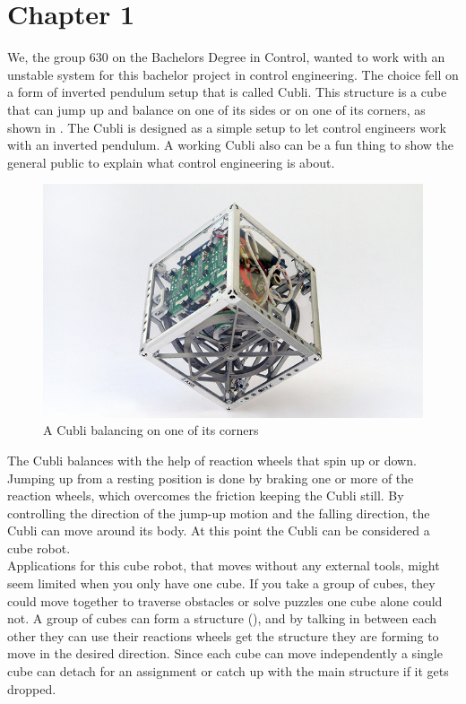 \chapter{Chapter 1}
We, the group 630 on the Bachelors Degree in Control, wanted to work with an unstable system for this bachelor project in control engineering. The choice fell on a form of inverted pendulum setup that is called Cubli. This structure is a cube that can jump up and balance on one of its sides or on one of its corners, as shown in .
The Cubli is designed as a simple setup to let control engineers work with an inverted pendulum. A working Cubli also can be a fun thing to show the general public to explain what control engineering is about.  \cite{MGajamohan}

\begin{figure}[H] 
	\centering
	\includegraphics[scale=1.3]{figures/CubliCorner-700x430}
	\caption{A Cubli balancing on one of its corners\cite{RAndrea}}
	\label{CubliCorner}
\end{figure} 
The Cubli balances with the help of reaction wheels that spin up or down. Jumping up from a resting position is done by braking one or more of the reaction wheels, which overcomes the friction keeping the Cubli still. 
By controlling the direction of the jump-up motion and the falling direction, the Cubli can move around its body. At this point the Cubli can be considered a cube robot.\\
Applications for this cube robot, that moves without any external tools, might seem limited when you only have one cube. If you take a group of cubes, they could move together to traverse obstacles or solve puzzles one cube alone could not. A group of cubes can form a structure (), and by talking in between each other they can use their reactions wheels get the structure they are forming to move in the desired direction. Since each cube can move independently a single cube can detach for an assignment or catch up with the main structure if it gets dropped.\cite{JRomanishin}

